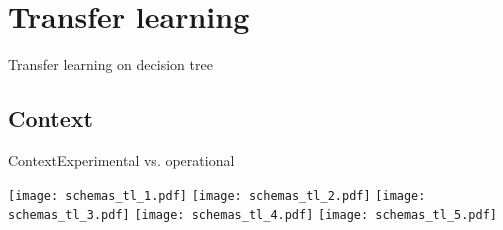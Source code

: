 \section{Transfer learning}

\begingroup
{}  %
\begin{frame}[noframenumbering]{}
    \centering
    \vspace{3cm}
    \Huge
    \textcolor{myblue}{Transfer learning on decision tree}
\end{frame}
\endgroup

\subsection{Context}

\begin{frame}{Context}{Experimental vs. operational}
    
    \renewcommand{\ratio}{0.9}
    \begin{overprint}
        \centering\texttt{[image: schemas\_tl\_1.pdf]}
        \centering\texttt{[image: schemas\_tl\_2.pdf]}
        \centering\texttt{[image: schemas\_tl\_3.pdf]}
        \centering\texttt{[image: schemas\_tl\_4.pdf]}
        \centering\texttt{[image: schemas\_tl\_5.pdf]}
    \end{overprint}

\end{frame}


